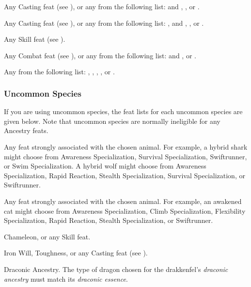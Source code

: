      Any Casting feat (see ), or any from the following list:  and , , or .

     Any Casting feat (see ), or any from the following list: ,  and , , or .

     Any Skill feat (see ).

     Any Combat feat (see ), or any from the following list:  and , or .

     Any from the following list: , , , , or .

    \subsubsection{Uncommon Species}
      If you are using uncommon species, the feat lists for each uncommon species are given below.
      Note that uncommon species are normally ineligible for any Ancestry feats.

       Any feat strongly associated with the chosen animal. For example, a hybrid shark might choose from Awareness Specialization, Survival Specialization, Swiftrunner, or Swim Specialization. A hybrid wolf might choose from Awareness Specialization, Rapid Reaction, Stealth Specialization, Survival Specialization, or Swiftrunner.

       Any feat strongly associated with the chosen animal. For example, an awakened cat might choose from Awareness Specialization, Climb Specialization, Flexibility Specialization, Rapid Reaction, Stealth Specialization, or Swiftrunner.

       Chameleon, or any Skill feat.

       Iron Will, Toughness, or any Casting feat (see ).

       Draconic Ancestry. The type of dragon chosen for the drakkenfel's \textit{draconic ancestry} must match its \textit{draconic essence}.

